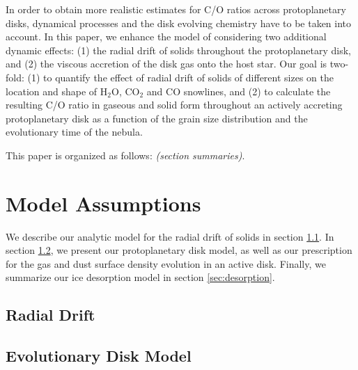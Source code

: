 \documentclass[apj]{emulateapj}
\newcommand{\emgr}[1]{\emph{ \color{gray} #1}}
\begin{document}
In order to obtain more realistic estimates for C/O ratios across protoplanetary disks, dynamical processes and the disk evolving chemistry have to be taken into account. In this paper, we enhance the model of \citet{oberg11} considering two additional dynamic effects: (1) the radial drift of solids throughout the protoplanetary disk, and (2) the viscous accretion of the disk gas onto the host star. Our goal is two-fold: (1) to quantify the effect of radial drift of solids of different sizes on the location and shape of H$_2$O, CO$_2$ and CO snowlines, and (2) to calculate the resulting C/O ratio in gaseous and solid form throughout an actively accreting protoplanetary disk as a function of the grain size distribution and the evolutionary time of the nebula.



This paper is organized as follows: \emgr{(section summaries)}.

\section{Model Assumptions} 
\label{sec:model}

We describe our analytic model for the radial drift of solids in section \ref{sec:drift}. In section \ref{sec:disk}, we present our protoplanetary disk model, as well as our prescription for the gas and dust surface density evolution in an active disk. Finally, we summarize our ice desorption model in section \ref{sec:desorption}.

\subsection{Radial Drift}
\label{sec:drift}

\subsection{Evolutionary Disk Model}
\label{sec:disk}
\end{document}
